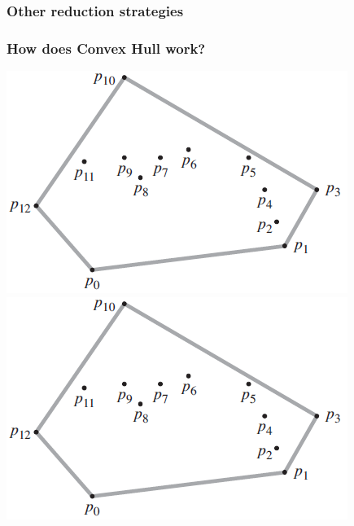 \subsubsection{Other reduction strategies}
\begin{frame}
\frametitle{How does Convex Hull work?}
	\begin{center}
		\includegraphics[scale=0.5]{graphics/convexHull-example}
		\includegraphics[scale=0.5]{graphics/convexHull-example}
	\end{center}
\end{frame}
